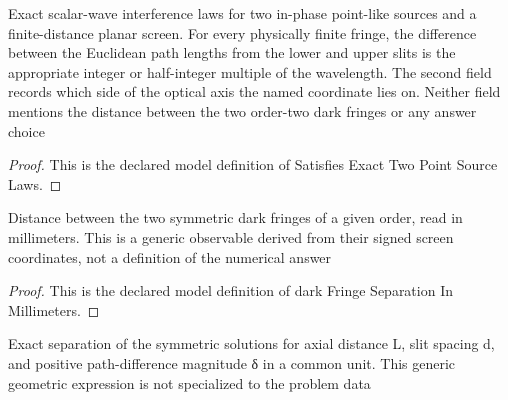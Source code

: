 \begin{definition}
  \label{def:physics:phyx-mini-0248:phyxminiproblems-problemphyxmini0248-satisfiesexacttwopointsourcelaws}
  Exact scalar-wave interference laws for two in-phase point-like sources and a finite-distance planar screen. For every physically finite fringe, the difference between the Euclidean path lengths from the lower and upper slits is the appropriate integer or half-integer multiple of the wavelength. The second field records which side of the optical axis the named coordinate lies on. Neither field mentions the distance between the two order-two dark fringes or any answer choice
\end{definition}
\begin{proof}
  This is the declared model definition of Satisfies Exact Two Point Source Laws.
\end{proof}
\begin{definition}
  \label{def:physics:phyx-mini-0248:phyxminiproblems-problemphyxmini0248-darkfringeseparationinmillimeters}
  Distance between the two symmetric dark fringes of a given order, read in millimeters. This is a generic observable derived from their signed screen coordinates, not a definition of the numerical answer
\end{definition}
\begin{proof}
  This is the declared model definition of dark Fringe Separation In Millimeters.
\end{proof}
\begin{definition}
  \label{def:physics:phyx-mini-0248:phyxminiproblems-problemphyxmini0248-finitescreensymmetricseparation}
  Exact separation of the symmetric solutions for axial distance L, slit spacing d, and positive path-difference magnitude δ in a common unit. This generic geometric expression is not specialized to the problem data
\end{definition}
